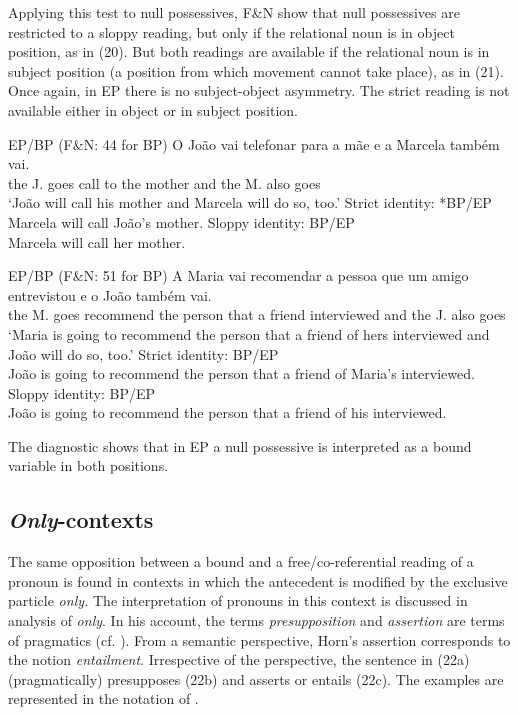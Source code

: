 \documentclass[output=paper]{langsci/langscibook}
\begin{document}
Applying this test to null possessives, F\&N show that null possessives are restricted to a sloppy reading, but only if the relational noun is in object position, as in (20). But both readings are available if the relational noun is in subject position (a position from which movement cannot take place), as in (21). Once again, in EP there is no subject-object asymmetry. The strict reading is not available either in object or in subject position.

\ea%
         EP\slash BP (F\&N: 44 for BP)\label{ex:wein:20}
    \ea
    \gll O João vai telefonar para a mãe e a Marcela também vai.\\
         the J. goes call to the mother and the M. also goes  \\
    \glt ‘João will call his mother and Marcela will do so, too.’
    \ex Strict identity: *BP\slash *EP\\Marcela will call João’s mother.
    \ex {}Sloppy identity: BP\slash EP\\Marcela will call her mother.
    \z
\z

\ea%
         EP\slash BP (F\&N: 51 for BP)\label{ex:wein:21}
    \ea
    \gll A Maria vai recomendar a pessoa que um amigo entrevistou e o João também vai.\\
         the M. goes recommend the person that a friend interviewed and the J. also goes\\
    \glt ‘Maria is going to recommend the person that a friend of hers interviewed and João will do so, too.’
    \ex Strict identity: BP\slash *EP\\João is going to recommend the person that a friend of Maria’s interviewed.\\
    \ex {}Sloppy identity: BP\slash EP\\João is going to recommend the person that a friend of his interviewed. 
    \z
\z

The diagnostic shows that in EP a null possessive is interpreted as a bound variable in both positions.

\subsection{\textit{Only}-contexts}%

The same opposition between a bound and a free\slash co-referential reading of a pronoun is found in contexts in which the antecedent is modified by the exclusive particle \textit{only.} The interpretation of pronouns in this context is discussed in  analysis of \textit{only}. In his account, the terms \textit{presupposition} and \textit{assertion} are terms of pragmatics (cf. \citealt{Pagin2016}). From a semantic perspective, Horn’s assertion corresponds to the notion \textit{entailment}. Irrespective of the perspective, the sentence in (22a) (pragmatically) presupposes (22b) and asserts or entails (22c). The examples are represented in the notation of \citet{Horn1969}. 
\end{document}
